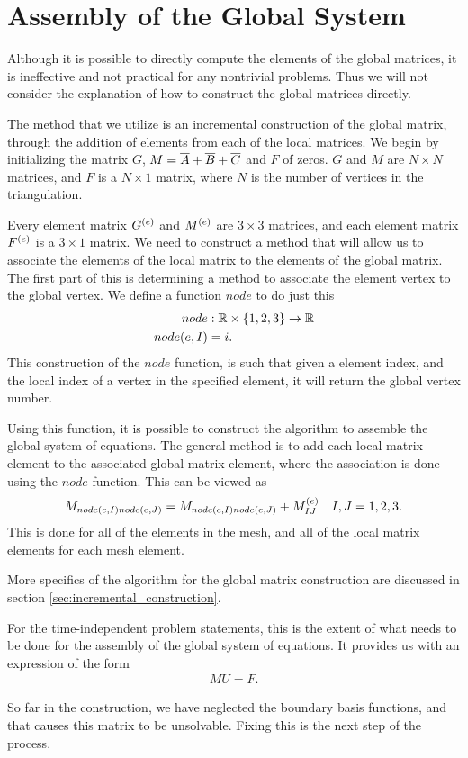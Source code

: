 \documentclass[../fem.tex]{subfile}
\begin{document}
\section{Assembly of the Global System}%
\label{sec:assembly_of_the_global_system}

Although it is possible to directly compute the elements of the global
matrices, it is ineffective and not practical for any nontrivial problems.
Thus we will not consider the explanation of how to construct the global
matrices directly.

The method that we utilize is an incremental construction of the global matrix,
through the addition of elements from each of the local matrices. We begin by
initializing the matrix $G$, $M=\overline{A}+\overline{B}+\overline{C}$ and $F$ of zeros. $G$ and
$M$ are $N\times N$ matrices, and $F$ is a $N\times 1$ matrix, where $N$ is the
number of vertices in the triangulation.

Every element matrix $G^{(e)}$ and $M^{(e)}$ are $3\times 3$ matrices, and each element matrix
$F^{(e)}$ is a $3\times 1$ matrix. We need to construct a method that will allow
us to associate the elements of the local matrix to the elements of the global
matrix. The first part of this is determining a method to associate the element
vertex to the global vertex. We define a function $node$ to do just this
\begin{align*}
  node&:\mathbb{R}\times\{1,2,3\}\rightarrow\mathbb{R}\\
  node(e,I)&=i.
\end{align*}
This construction of the $node$ function, is such that given a element index,
and the local index of a vertex in the specified element, it will return the
global vertex number.

Using this function, it is possible to construct the algorithm to assemble the
global system of equations. The general method is to add each local matrix
element to the associated global matrix element, where the association is done
using the $node$ function. This can be viewed as
\begin{align*}
  M_{node(e,I)node(e,J)}=M_{node(e,I)node(e,J)}+M^{(e)}_{IJ}\quad I,J=1,2,3.
\end{align*}
This is done for all of the elements in the mesh, and all of the local matrix
elements for each mesh element.

More specifics of the algorithm for the global matrix construction are
discussed in section \ref{sec:incremental_construction}.

For the time-independent problem statements, this is the extent of what needs
to be done for the assembly of the global system of equations. It provides us
with an expression of the form
\begin{align*}
   MU=F.
\end{align*}

So far in the construction, we have neglected the boundary basis functions, and
that causes this matrix to be unsolvable. Fixing this is the next step of the
process.
\end{document}
